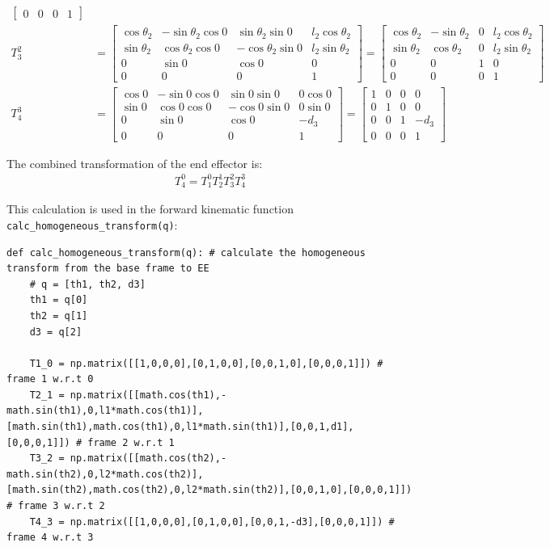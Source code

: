 \documentclass[10pt]{article}
\begin{document}
\begin{enumerate}
\begin{align*}
\begin{bmatrix}
		0 & 0 & 0 & 1
		\end{bmatrix}
		\\
		T_{3}^2 &= \begin{bmatrix}
		\cos\theta_2 & -\sin\theta_2 \cos 0 &\sin\theta_2 \sin 0 & l_2 \cos\theta_2 \\
		\sin\theta_2 & \cos\theta_2 \cos 0  & -\cos\theta_2 \sin 0 & l_2 \sin\theta_2 \\
		0 & \sin 0 & \cos 0 & 0 \\
		0 & 0 & 0 & 1
		\end{bmatrix} = \begin{bmatrix}
		\cos\theta_2 & -\sin\theta_2 & 0 & l_2 \cos\theta_2 \\
		\sin\theta_2 & \cos\theta_2 & 0 & l_2 \sin\theta_2 \\
		0 & 0 & 1 & 0 \\
		0 & 0 & 0 & 1
		\end{bmatrix}
		\\
		T_{4}^3 &= \begin{bmatrix}
		\cos 0 & -\sin 0 \cos 0 &\sin 0 \sin 0 & 0 \cos 0 \\
		\sin 0 & \cos 0 \cos 0 & -\cos 0 \sin 0 & 0 \sin 0 \\
		0 & \sin 0 & \cos 0 & -d_3 \\
		0 & 0 & 0 & 1
		\end{bmatrix} = \begin{bmatrix}
		1 & 0 & 0 & 0 \\
		0 & 1 & 0 & 0 \\
		0 & 0 & 1 & -d_3 \\
		0 & 0 & 0 & 1
		\end{bmatrix}
	\end{align*}
	
	The combined transformation of the end effector is:
	\begin{align*}
		T_4^0 = T_1^0 T_2^1 T_3^2 T_4^3
	\end{align*}
	
	This calculation is used in the forward kinematic function \texttt{calc\_homogeneous\_transform(q)}:
	
\begin{lstlisting}[style=Matlab-editor,basicstyle=\mlttfamily,escapechar=`]
def calc_homogeneous_transform(q): # calculate the homogeneous transform from the base frame to EE
	# q = [th1, th2, d3]
	th1 = q[0]
	th2 = q[1]
	d3 = q[2]
	
	T1_0 = np.matrix([[1,0,0,0],[0,1,0,0],[0,0,1,0],[0,0,0,1]]) # frame 1 w.r.t 0
	T2_1 = np.matrix([[math.cos(th1),-math.sin(th1),0,l1*math.cos(th1)],[math.sin(th1),math.cos(th1),0,l1*math.sin(th1)],[0,0,1,d1],[0,0,0,1]])	# frame 2 w.r.t 1 
	T3_2 = np.matrix([[math.cos(th2),-math.sin(th2),0,l2*math.cos(th2)],[math.sin(th2),math.cos(th2),0,l2*math.sin(th2)],[0,0,1,0],[0,0,0,1]])	# frame 3 w.r.t 2 
	T4_3 = np.matrix([[1,0,0,0],[0,1,0,0],[0,0,1,-d3],[0,0,0,1]]) # frame 4 w.r.t 3
	

\end{lstlisting}
\end{enumerate}
\end{document}
